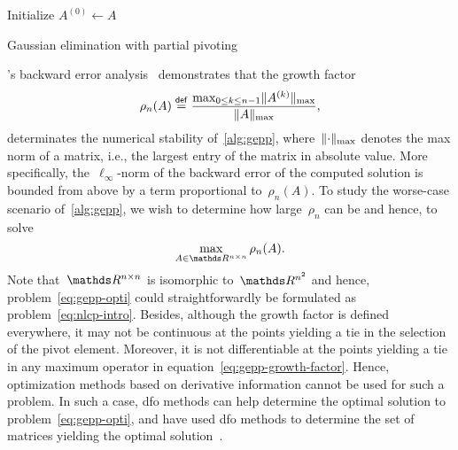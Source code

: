 \begin{algorithm}[htp]
    \DontPrintSemicolon
    Initialize $A^{(0)} \gets A$\;
    \caption{Gaussian elimination with partial pivoting}
    \label{alg:gepp}
\end{algorithm}

's backward error analysis~\cite{Wilkinson_1961} demonstrates that the growth factor
\begin{equation}
    \label{eq:gepp-growth-factor}
    \rho_n(A) \mathrel{\stackrel{\mathsf{def}}{=}} \frac{\max_{0 \le k \le n - 1} \lVert A^{(k)}\rVert_{\max}}{\lVert A\rVert_{\max}},
\end{equation}
determinates the numerical stability of~\cref{alg:gepp}, where~$\lVert\cdot\rVert_{\max}$ denotes the max norm of a matrix, i.e., the largest entry of the matrix in absolute value.
More specifically, the~$\ell_{\infty}$-norm of the backward error of the computed solution is bounded from above by a term proportional to~$\rho_n(A)$.
To study the worse-case scenario of~\cref{alg:gepp}, we wish to determine how large~$\rho_n$ can be and hence, to solve
\begin{equation}
    \label{eq:gepp-opti}
    \max_{A \in \R^{n \times n}} \rho_n(A).
\end{equation}
Note that~$\R^{n \times n}$ is isomorphic to~$\R^{n^2}$ and hence, problem~\cref{eq:gepp-opti} could straightforwardly be formulated as problem~\cref{eq:nlcp-intro}.
Besides, although the growth factor is defined everywhere, it may not be continuous at the points yielding a tie in the selection of the pivot element.
Moreover, it is not differentiable at the points yielding a tie in any maximum operator in equation~\cref{eq:gepp-growth-factor}.
Hence, optimization methods based on derivative information cannot be used for such a problem.
In such a case, \gls{dfo} methods can help determine the optimal solution to problem~\cref{eq:gepp-opti}, and \citeauthor{Higham_Higham_1989} have used \gls{dfo} methods to determine the set of matrices yielding the optimal solution~\cite{Higham_Higham_1989}.


